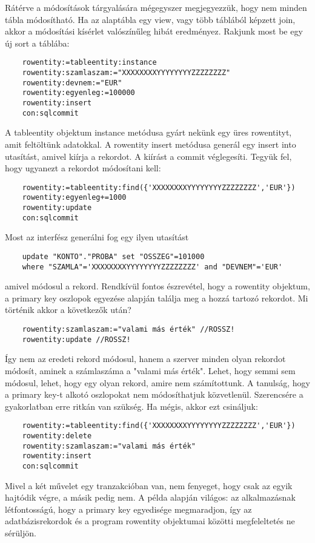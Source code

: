 Rátérve a módosítások tárgyalására mégegyszer megjegyezzük,
hogy nem minden tábla módosítható. Ha az alaptábla egy view,
vagy több táblából képzett join, akkor a módosítási kísérlet
valószínűleg hibát eredményez. 
Rakjunk most be egy új sort a táblába:
\begin{verbatim}
    rowentity:=tableentity:instance
    rowentity:szamlaszam:="XXXXXXXXYYYYYYYYZZZZZZZZ"
    rowentity:devnem:="EUR"
    rowentity:egyenleg:=100000
    rowentity:insert
    con:sqlcommit
\end{verbatim}
A tableentity objektum instance metódusa gyárt nekünk egy
üres rowentityt, amit feltöltünk adatokkal. A rowentity insert
metódusa generál egy insert into utasítást, amivel kiírja a rekordot.
A kiírást a commit véglegesíti. Tegyük fel, hogy ugyanezt 
a rekordot módosítani kell:
\begin{verbatim}
    rowentity:=tableentity:find({'XXXXXXXXYYYYYYYYZZZZZZZZ','EUR'})
    rowentity:egyenleg+=1000
    rowentity:update
    con:sqlcommit
\end{verbatim}
Most az interfész generálni fog egy ilyen utasítást
\begin{verbatim}
    update "KONTO"."PROBA" set "OSSZEG"=101000 
    where "SZAMLA"='XXXXXXXXYYYYYYYYZZZZZZZZ' and "DEVNEM"='EUR'
\end{verbatim}
amivel módosul a rekord. Rendkívül fontos észrevétel, hogy
a rowentity objektum, a primary key oszlopok egyezése alapján
találja meg a hozzá tartozó rekordot. Mi történik akkor
a következők után?
\begin{verbatim}
    rowentity:szamlaszam:="valami más érték" //ROSSZ!
    rowentity:update //ROSSZ!
\end{verbatim}
Így nem az eredeti rekord módosul, hanem a szerver minden olyan
rekordot módosít, aminek a számlaszáma a "valami más érték".
Lehet, hogy semmi sem módosul, lehet, hogy egy olyan rekord,
amire nem számítottunk. A tanulság, hogy a primary key-t alkotó
 oszlopokat nem módosíthatjuk közvetlenül.
Szerencsére a gyakorlatban erre ritkán van szükség. Ha mégis,
akkor ezt csináljuk:
\begin{verbatim}
    rowentity:=tableentity:find({'XXXXXXXXYYYYYYYYZZZZZZZZ','EUR'})
    rowentity:delete
    rowentity:szamlaszam:="valami más érték"
    rowentity:insert
    con:sqlcommit
\end{verbatim}
Mivel a két művelet egy tranzakcióban van, nem fenyeget,
hogy csak az egyik hajtódik végre, a másik pedig nem.
A példa alapján világos: az alkalmazásnak létfontosságú,
hogy a primary key egyedisége megmaradjon, így az adatbázisrekordok 
és a program rowentity objektumai közötti megfeleltetés ne sérüljön.

